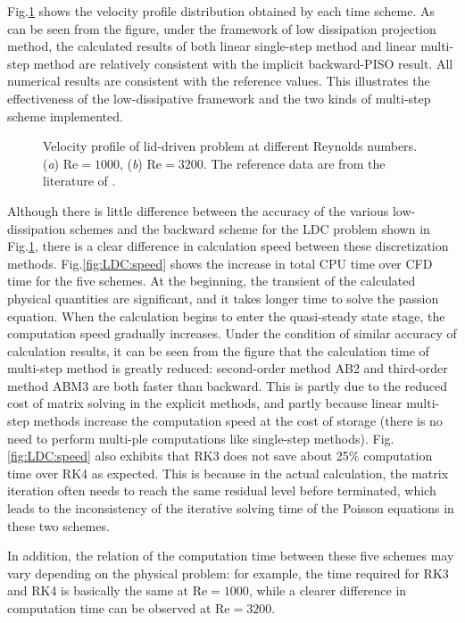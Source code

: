 \documentclass{article}
\begin{document}
Fig.\ref{fig:LDC:profile} shows the velocity profile distribution obtained by each time scheme. As can be seen from the figure, under the framework of low dissipation projection method, the calculated results of both linear single-step method and linear multi-step method are relatively consistent with the implicit backward-PISO result. All numerical results are consistent with the reference values. This illustrates the effectiveness of the low-dissipative framework and the two kinds of multi-step scheme implemented.

\begin{figure}
	\centering
	\caption{Velocity profile of lid-driven problem at different Reynolds numbers. (\textit{a}) $\mathrm{Re}=1000$, (\textit{b}) $\mathrm{Re}=3200$. The reference data are from the literature of \citet{Ghia:1982}.}
	\label{fig:LDC:profile}
\end{figure}

Although there is little difference between the accuracy of the various low-dissipation schemes and the backward scheme for the LDC problem shown in Fig.\ref{fig:LDC:profile}, there is a clear difference in calculation speed between these discretization methods. Fig.\ref{fig:LDC:speed} shows the increase in total CPU time over CFD time for the five schemes. At the beginning, the transient of the calculated physical quantities are significant, and it takes longer time to solve the passion equation. When the calculation begins to enter the quasi-steady state stage, the computation speed gradually increases. Under the condition of similar accuracy of calculation results, it can be seen from the figure that the calculation time of multi-step method is greatly reduced: second-order method AB2 and third-order method ABM3 are both faster than backward. This is partly due to the reduced cost of matrix solving in the explicit methods, and partly because linear multi-step methods increase the computation speed at the cost of storage (there is no need to perform multi-ple computations like single-step methods). Fig.\ref{fig:LDC:speed} also exhibits that RK3 does not save about 25\% computation time over RK4 as expected. This is because in the actual calculation, the matrix iteration often needs to reach the same residual level before terminated, which leads to the inconsistency of the iterative solving time of the Poisson equations in these two schemes.

In addition, the relation of the computation time between these five schemes may vary depending on the physical problem: for example, the time required for RK3 and RK4 is basically the same at $\mathrm{Re}=1000$, while a clearer difference in computation time can be observed at $\mathrm{Re}=3200$.
\end{document}

